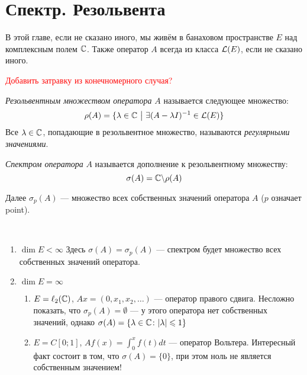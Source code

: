 \section{Спектр. Резольвента}

\begin{note}
	В этой главе, если не сказано иного, мы живём в банаховом пространстве $E$ над комплексным полем $\mathbb{C}$. Также оператор $A$ всегда из класса $\mathcal{L}(E)$, если не сказано иного.
\end{note}

\textcolor{red}{Добавить затравку из конечномерного случая?}

\begin{definition}
	\textit{Резольвентным множеством оператора} $A$ называется следующее множество:
	\[
		\rho(A) = \{\lambda \in \mathbb{C} \ \big|\  \exists (A - \lambda I)^{-1} \in \mathcal{L}(E)\}
	\]
	Все $\lambda \in \mathbb{C}$, попадающие в резольвентное множество, называются \textit{регулярными значениями}.
\end{definition}

\begin{definition}
	\textit{Спектром оператора} $A$ называется дополнение к резольвентному множеству:
	\[
		\sigma(A) = \mathbb{C} \backslash \rho(A)
	\]
\end{definition}

\begin{note}
	Далее $\sigma_p(A)$ --- множество всех собственных значений оператора $A$ ($p$ означает point).
\end{note}

\begin{example}~
	\begin{enumerate}
		\item $\dim E < \infty$ Здесь $\sigma(A) = \sigma_p(A)$ --- спектром будет множество всех собственных значений оператора.
		
		\item $\dim E = \infty$
		\begin{enumerate}
			\item $E = \ell_2(\mathbb{C})$, $Ax = (0, x_1, x_2, \ldots)$ --- оператор правого сдвига. Несложно показать, что $\sigma_p(A) = \emptyset$ --- у этого оператора нет собственных значений, однако   $\sigma(A) = \{\lambda \in \mathbb{C} \colon |\lambda| \leqslant 1\}$
			
			\item $E = C[0; 1]$, $Af(x) = \int_0^x f(t)dt$ --- оператор Вольтера. Интересный факт состоит в том, что $\sigma(A) = \{0\}$, при этом ноль не является собственным значением!
		\end{enumerate}
	\end{enumerate}
\end{example}


